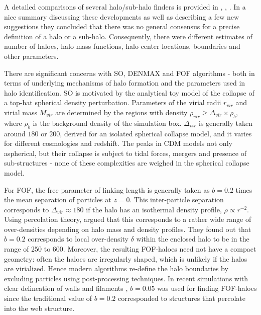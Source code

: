 
A detailed comparisons of several halo/sub-halo finders is provided in \cite{Knebe2011a}, \cite{Knebe2013}, \cite{Onions2012}. In a nice summary discussing  these developments as well as describing a few new suggestions they  concluded that there was no general consensus for a precise definition of a halo or a sub-halo. Consequently, there were different estimates of number of haloes, halo mass functions, halo center locations, boundaries and other parameters. 



There are significant concerns with SO, DENMAX and FOF algorithms - both in terms of underlying mechanisms of halo formation and the parameters used in halo identification. SO is motivated by the analytical toy model of the collapse of a top-hat spherical density perturbation. Parameters of the virial radii $r_{vir}$ and virial mass $M_{vir}$ are determined by the regions with density $\rho_{vir} \geq \Delta_{vir} \times \rho_b$, where $\rho_b$ is the background density of the simulation box. $\Delta_{vir}$ is generally taken around $180$ or $200$, derived for an isolated spherical collapse model, and it varies for different cosmologies and redshift. The peaks in CDM models  not only aspherical, but their collapse is subject to tidal forces, mergers and presence of sub-structures - none of these complexities are weighed in the spherical collapse model. 


For FOF, the free parameter of linking length is generally taken as $b = 0.2$ times the mean separation of particles at $z=0$. This inter-particle separation corresponds to $\Delta_{vir} \approx 180$ if the halo has an isothermal density profile, $\rho \propto r^{-2}$. Using percolation theory, \cite{More2011} argued that this corresponds to a rather wide range of over-densities depending on halo mass and density profiles. They found out that $b = 0.2$ corresponds to local over-density $\delta$ within the enclosed halo to be in the range of 250 to 600. Moreover, the resulting FOF-haloes need not have a compact geometry: often the haloes are irregularly shaped, which is unlikely if the halos are virialized.
Hence modern algorithms re-define the halo boundaries by excluding particles using post-processing techniques. In recent simulations with clear delineation of walls and filaments \cite{Angulo2013a}, $b=0.05$ was used for finding FOF-haloes since the traditional value of $b = 0.2$ corresponded to structures that percolate into the web structure.

